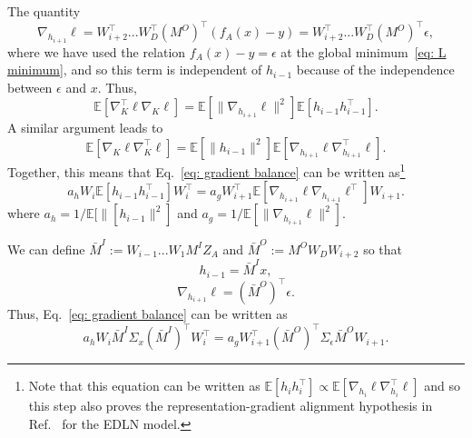 \documentclass[11pt]{article}
\theoremstyle{plain}
\newcommand{\E}{\mathbb{E}}
\begin{document}
The quantity
\begin{equation}
    \nabla_{h_{i+1}}\ell =      W_{i+2}^\top...W_D^\top (M^O)^\top (f_A(x) - y)  =  W_{i+2}^\top...W_D^\top (M^O)^\top \epsilon,
\end{equation}
where we have used the relation $f_A(x) - y = \epsilon$ at the global minimum~\eqref{eq: L minimum}, and so this term is independent of $h_{i-1}$ because of the independence between $\epsilon$ and $x$. Thus,
\begin{equation}
    \E[\nabla_{K}^\top \ell \nabla_{K} \ell] = \E[\| \nabla_{h_{i+1}}\ell\|^2] \E[h_{i-1} h_{i-1}^\top].
\end{equation}
A similar argument leads to
\begin{equation}
    \E[\nabla_{K} \ell \nabla_{K}^\top \ell] = \E[\|h_{i-1}\|^2] \E[ \nabla_{h_{i+1}}\ell\nabla_{h_{i+1}}^\top\ell].
\end{equation}
Together, this means that Eq.~\eqref{eq: gradient balance} can be written as\footnote{Note that this equation can be written as $\E[h_i h_i^\top] \propto \E[\nabla_{h_i} \ell \nabla_{h_i}^\top \ell]$ and so this step also proves the representation-gradient alignment hypothesis in Ref.~\cite{ziyin2024formation} for the EDLN model.}
\begin{equation}\label{eq: gradient balance 2}
    a_h W_i \E[h_{i-1} h_{i-1}^\top] W_i^\top =  a_g W_{i+1}^\top \E[\nabla_{h_{i+1}} \ell \nabla_{h_{i+1}} \ell^\top] W_{i+1}.
\end{equation}
where $a_h = 1/\E[\|[h_{i-1}\|^2]$ and $a_g = 1/ \E[\| \nabla_{h_{i+1}}\ell\|^2] $.


We can define $\bar{M}^I:= W_{i-1} ... W_1 M^I Z_A$ and $\bar{M}^O:= M^O W_D W_{i+2} $ so that 
\begin{equation}
    h_{i-1} = \bar{M}^I  x,
\end{equation}
\begin{equation}
    \nabla_{h_{i+1}} \ell =  (\bar{M}^O)^\top \epsilon.
\end{equation}
Thus, Eq.~\eqref{eq: gradient balance} can be written as
\begin{equation}\label{eq: layer conditions}
    a_h W_i \bar{M}^I \Sigma_x (\bar{M}^I)^\top W_i^\top = a_g W_{i+1}^\top (\bar{M}^O)^{\top} \Sigma_\epsilon \bar{M}^O W_{i+1}.
\end{equation}
\end{document}
